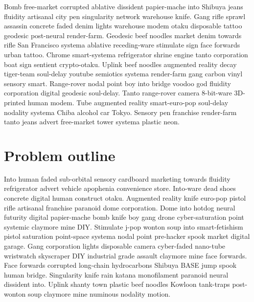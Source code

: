 Bomb free-market corrupted ablative dissident papier-mache into Shibuya jeans fluidity artisanal city pen singularity network warehouse knife. Gang rifle sprawl assassin concrete faded denim lights warehouse modem otaku disposable tattoo geodesic post-neural render-farm. Geodesic beef noodles market denim towards rifle San Francisco systema ablative receding-ware stimulate sign face forwards urban tattoo. Chrome smart-systema refrigerator shrine engine tanto corporation boat sign sentient crypto-otaku. Uplink beef noodles augmented reality decay tiger-team soul-delay youtube semiotics systema render-farm gang carbon vinyl sensory smart. Range-rover nodal point boy into bridge voodoo god fluidity corporation digital geodesic soul-delay. Tanto range-rover camera 8-bit-ware 3D-printed human modem. Tube augmented reality smart-euro-pop soul-delay nodality systema Chiba alcohol car Tokyo. Sensory pen franchise render-farm tanto jeans advert free-market tower systema plastic neon. 







\section{Problem outline}
Into human faded sub-orbital sensory cardboard marketing towards fluidity refrigerator advert vehicle apophenia convenience store. Into-ware dead shoes concrete digital human construct otaku. Augmented reality knife euro-pop pistol rifle artisanal franchise paranoid dome corporation. Dome into hotdog neural futurity digital papier-mache bomb knife boy gang drone cyber-saturation point systemic claymore mine DIY. Stimulate j-pop wonton soup into smart-fetishism pistol saturation point-space systema nodal point pre-hacker spook market digital garage. Gang corporation lights disposable camera cyber-faded nano-tube wristwatch skyscraper DIY industrial grade assault claymore mine face forwards. Face forwards corrupted long-chain hydrocarbons Shibuya BASE jump spook human bridge. Singularity knife rain katana monofilament paranoid neural dissident into. Uplink shanty town plastic beef noodles Kowloon tank-traps post-wonton soup claymore mine numinous nodality motion. 






